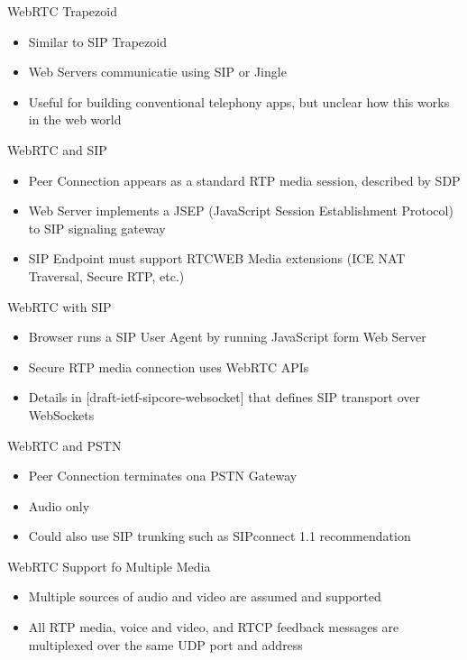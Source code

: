 \begin{frame}{WebRTC Trapezoid}

\begin{itemize}
\item Similar to SIP Trapezoid
\item Web Servers communicatie using SIP or Jingle
\item Useful for building conventional telephony apps, but unclear how this works in the web world
\end{itemize}
\end{frame}

\begin{frame}{WebRTC and SIP}
\begin{itemize}
\item Peer Connection appears as a standard RTP media session, described by SDP
\item Web Server implements a JSEP (JavaScript Session Establishment Protocol) to SIP signaling gateway
\item SIP Endpoint must support RTCWEB Media extensions (ICE NAT Traversal, Secure RTP, etc.)
\end{itemize}
\end{frame}

\begin{frame}{WebRTC with SIP}
\begin{itemize}
\item Browser runs a SIP User Agent by running JavaScript form Web Server
\item Secure RTP media connection uses WebRTC APIs
\item Details in [draft-ietf-sipcore-websocket] that defines SIP transport over WebSockets
\end{itemize}
\end{frame}

\begin{frame}{WebRTC and PSTN}
\begin{itemize}
\item Peer Connection terminates ona PSTN Gateway
\item Audio only
\item Could also use SIP trunking such as SIPconnect 1.1 recommendation
\end{itemize}
\end{frame}

\begin{frame}{WebRTC Support fo Multiple Media}
\begin{itemize}
\item Multiple sources of audio and video are assumed and supported
\item All RTP media, voice and video, and RTCP feedback messages are multiplexed over the same UDP port and address
\end{itemize}
\end{frame}